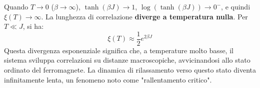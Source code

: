 Quando $T \to 0$ ($\beta \to \infty$), $\tanh(\beta J) \to 1$, $\log(\tanh(\beta J)) \to 0^-$, e quindi $\xi(T) \to \infty$. La lunghezza di correlazione \textbf{diverge a temperatura nulla}. Per $T \ll J$, si ha:
\begin{equation}
\xi(T) \approx \frac{1}{2} e^{2\beta J}
\end{equation}
Questa divergenza esponenziale significa che, a temperature molto basse, il sistema sviluppa correlazioni su distanze macroscopiche, avvicinandosi allo stato ordinato del ferromagnete. La dinamica di rilassamento verso questo stato diventa infinitamente lenta, un fenomeno noto come "rallentamento critico".
